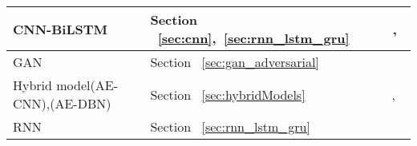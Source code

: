 \begin{table*}
\begin{center}
{\begin{tabular}{|p{3cm}|p{2cm}|p{10cm}|}
      CNN-BiLSTM& Section ~\ref{sec:cnn},~\ref{sec:rnn_lstm_gru} &  ~\cite{le2018deep},~\cite{wang2017adversary} \\\hline
      GAN& Section ~\ref{sec:gan_adversarial} &  ~\cite{kim2018zero} \\\hline
      Hybrid model(AE-CNN),(AE-DBN) & Section ~\ref{sec:hybridModels} &  ~\cite{wang2018effective},~\cite{li2015hybrid} \\\hline
      RNN & Section ~\ref{sec:rnn_lstm_gru} &  ~\cite{haddadpajouh2018deep} \\\hline
    \end{tabular}}
  \end{center}
\end{table*}







